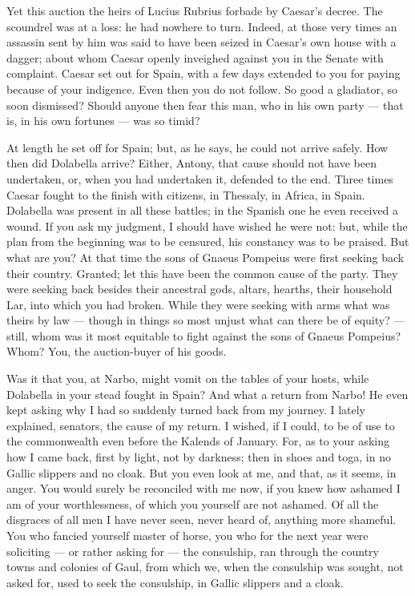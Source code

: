  Yet this auction the heirs of Lucius Rubrius forbade by Caesar's decree. The scoundrel was at a loss: he had nowhere to turn. Indeed, at those very times an assassin sent by him was said to have been seized in Caesar's own house with a dagger; about whom Caesar openly inveighed against you in the Senate with complaint. Caesar set out for Spain, with a few days extended to you for paying because of your indigence. Even then you do not follow. So good a gladiator, so soon dismissed? Should anyone then fear this man, who in his own party --- that is, in his own fortunes --- was so timid?

 At length he set off for Spain; but, as he says, he could not arrive safely. How then did Dolabella arrive? Either, Antony, that cause should not have been undertaken, or, when you had undertaken it, defended to the end. Three times Caesar fought to the finish with citizens, in Thessaly, in Africa, in Spain. Dolabella was present in all these battles; in the Spanish one he even received a wound. If you ask my judgment, I should have wished he were not: but, while the plan from the beginning was to be censured, his constancy was to be praised. But what are you? At that time the sons of Gnaeus Pompeius were first seeking back their country. Granted; let this have been the common cause of the party. They were seeking back besides their ancestral gods, altars, hearths, their household Lar, into which you had broken. While they were seeking with arms what was theirs by law --- though in things so most unjust what can there be of equity? --- still, whom was it most equitable to fight against the sons of Gnaeus Pompeius? Whom? You, the auction-buyer of his goods.

 Was it that you, at Narbo, might vomit on the tables of your hosts, while Dolabella in your stead fought in Spain? And what a return from Narbo! He even kept asking why I had so suddenly turned back from my journey. I lately explained, senators, the cause of my return. I wished, if I could, to be of use to the commonwealth even before the Kalends of January. For, as to your asking how I came back, first by light, not by darkness; then in shoes and toga, in no Gallic slippers and no cloak. But you even look at me, and that, as it seems, in anger. You would surely be reconciled with me now, if you knew how ashamed I am of your worthlessness, of which you yourself are not ashamed. Of all the disgraces of all men I have never seen, never heard of, anything more shameful. You who fancied yourself master of horse, you who for the next year were soliciting --- or rather asking for --- the consulship, ran through the country towns and colonies of Gaul, from which we, when the consulship was sought, not asked for, used to seek the consulship, in Gallic slippers and a cloak.

